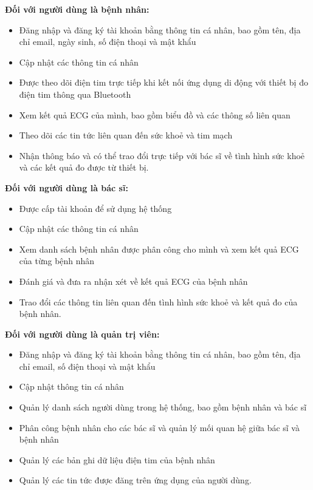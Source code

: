 \textbf{Đối với người dùng là bệnh nhân:}
\begin{adjustwidth}{1.5em}{}
\begin{itemize}
    \item Đăng nhập và đăng ký tài khoản bằng thông tin cá nhân, bao gồm tên, địa chỉ email, ngày sinh, số điện thoại và mật khẩu
    \item Cập nhật các thông tin cá nhân
    \item Được theo dõi điện tim trực tiếp khi kết nối ứng dụng di động với thiết bị đo điện tim thông qua Bluetooth
    \item Xem kết quả ECG của mình, bao gồm biểu đồ và các thông số liên quan
    \item Theo dõi các tin tức liên quan đến sức khoẻ và tim mạch
    \item Nhận thông báo và có thể trao đổi trực tiếp với bác sĩ về tình hình sức khoẻ và các kết quả đo được từ thiết bị.
\end{itemize}
\end{adjustwidth}
\textbf{Đối với người dùng là bác sĩ:}
\begin{adjustwidth}{1.5em}{}
\begin{itemize}
    \item Được cấp tài khoản để sử dụng hệ thống
    \item Cập nhật các thông tin cá nhân
    \item Xem danh sách bệnh nhân được phân công cho mình và xem kết quả ECG của từng bệnh nhân
    \item Đánh giá và đưa ra nhận xét về kết quả ECG của bệnh nhân
    \item Trao đổi các thông tin liên quan đến tình hình sức khoẻ và kết quả đo của bệnh nhân.
\end{itemize}
\end{adjustwidth}
\textbf{Đối với người dùng là quản trị viên:}
\begin{adjustwidth}{1.5em}{}
\begin{itemize}
    \item Đăng nhập và đăng ký tài khoản bằng thông tin cá nhân, bao gồm tên, địa chỉ email, số điện thoại và mật khẩu
    \item Cập nhật thông tin cá nhân
    \item Quản lý danh sách người dùng trong hệ thống, bao gồm bệnh nhân và bác sĩ
    \item Phân công bệnh nhân cho các bác sĩ và quản lý mối quan hệ giữa bác sĩ và bệnh nhân
    \item Quản lý các bản ghi dữ liệu điện tim của bệnh nhân
    \item Quản lý các tin tức được đăng trên ứng dụng của người dùng.
\end{itemize}
\end{adjustwidth}

